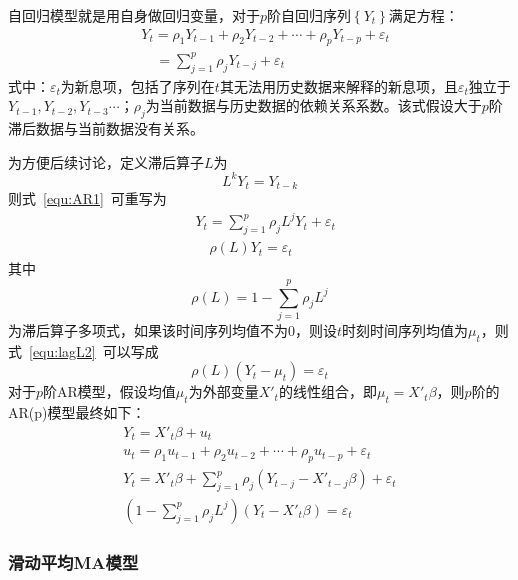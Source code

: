 自回归模型就是用自身做回归变量，对于$p$阶自回归序列$\left\{ {{Y}_{t}} \right\}$满足方程：
\begin{align}
  \label{equ:AR1}
  & {{Y}_{t}}={{\rho }_{1}}{{Y}_{t-1}}+{{\rho }_{2}}{{Y}_{t-2}}+\cdots +{{\rho }_{p}}{{Y}_{t-p}}+{{\varepsilon }_{t}} \\ 
 & \quad =\sum\limits_{j=1}^{p}{{{\rho }_{j}}{{Y}_{t-j}}}+{{\varepsilon }_{t}} \nonumber
\end{align}
式中：${\varepsilon }_{t}$为新息项，包括了序列在$t$其无法用历史数据来解释的新息项，且${\varepsilon }_{t}$独立于${{Y}_{t-1}},{{Y}_{t-2}},{{Y}_{t-3}}\cdots $；${\rho }_{j}$为当前数据与历史数据的依赖关系系数。该式假设大于$p$阶滞后数据与当前数据没有关系。

为方便后续讨论，定义滞后算子$L$为
\begin{equation}
	\label{equ:lagL}
	{{L}^{k}}{{Y}_{t}}={{Y}_{t-k}}
\end{equation}
则式~\ref{equ:AR1}~可重写为
\begin{align}
  & {{Y}_{t}}=\sum\limits_{j=1}^{p}{{{\rho }_{j}}{{L}^{j}}{{Y}_{t}}}+{{\varepsilon }_{t}} \\ 
  \label{equ:lagL2}
 & \quad \rho (L){{Y}_{t}}={{\varepsilon }_{t}}
\end{align}
其中
\begin{equation}
	\label{equ:AR3}
	\rho (L)=1-\sum\limits_{j=1}^{p}{{{\rho }_{j}}{{L}^{j}}}
\end{equation}
为滞后算子多项式，如果该时间序列均值不为0，则设$t$时刻时间序列均值为${{\mu }_{t}}$，则式~\ref{equ:lagL2}~可以写成
\begin{equation}
	\rho (L)({{Y}_{t}}-{{\mu }_{t}})={{\varepsilon }_{t}}
\end{equation}
对于$p$阶AR模型，假设均值${{\mu }_{t}}$为外部变量${X'}_{t}$的线性组合，即${{\mu }_{t}}={{{X}'}_{t}}\beta $，则$p$阶的AR(p)模型最终如下：
\begin{gather}
  	{{Y}_{t}}={{{{X}'}}_{t}}\beta +{{u}_{t}} \\ 
 	{{u}_{t}}={{\rho }_{1}}{{u}_{t-1}}+{{\rho }_{2}}{{u}_{t-2}}+\cdots +{{\rho }_{p}}{{u}_{t-p}}+{{\varepsilon }_{t}} \\ 
 	{{Y}_{t}}={{{{X}'}}_{t}}\beta +\sum\limits_{j=1}^{p}{{{\rho }_{j}}({{Y}_{t-j}}-{{{{X}'}}_{t-j}}\beta )+}{{\varepsilon }_{t}} \\ 
 	\left( 1-\sum\limits_{j=1}^{p}{{{\rho }_{j}}{{L}^{j}}} \right)({{Y}_{t}}-{{{{X}'}}_{t}}\beta )={{\varepsilon }_{t}} 
\end{gather}

\subsubsection{滑动平均MA模型}

